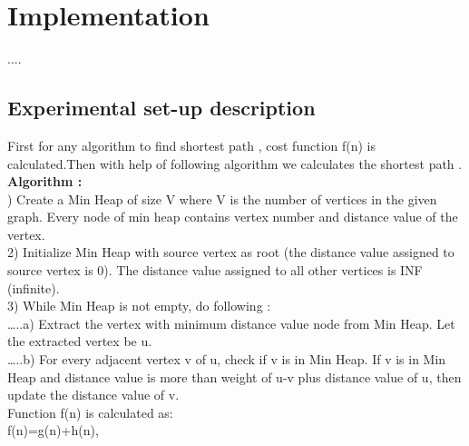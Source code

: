 \documentclass[14pt,a4]{extreport}
\begin{document}
\chapter{Implementation}


....

\section{Experimental set-up description}

First for any algorithm to find shortest path , cost function f(n) is calculated.Then with help of following algorithm we calculates the shortest path .\\
\newline
\textbf{Algorithm :}\\
) Create a Min Heap of size V where V is the number of vertices in the given graph. Every node of min heap contains vertex number and distance value of the vertex.\\
2) Initialize Min Heap with source vertex as root (the distance value assigned to source vertex is 0). The distance value assigned to all other vertices is INF (infinite).\\
3) While Min Heap is not empty, do following :\\
…..a) Extract the vertex with minimum distance value node from Min Heap. Let the extracted vertex be u.\\
…..b) For every adjacent vertex v of u, check if v is in Min Heap. If v is in Min Heap and distance value is more than weight of u-v plus distance value of u, then update the distance value of v.\\


Function f(n) is calculated as:\\

             f(n)=g(n)+h(n),\\
                   
\end{document}
